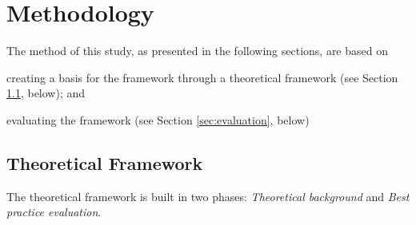 \chapter{Methodology}
\label{chap:methodology}

The method of this study, as presented in the following sections, are based on \begin{enumerate*}[label=(\(\arabic*\))]
  \item creating a basis for the framework through a theoretical framework (see Section \ref{sec:theoretical_framework}, below); and
  \item evaluating the framework (see Section \ref{sec:evaluation}, below)
\end{enumerate*}

\section{Theoretical Framework}
\label{sec:theoretical_framework}
The theoretical framework is built in two phases: \textit{Theoretical background} and \textit{Best practice evaluation}.

